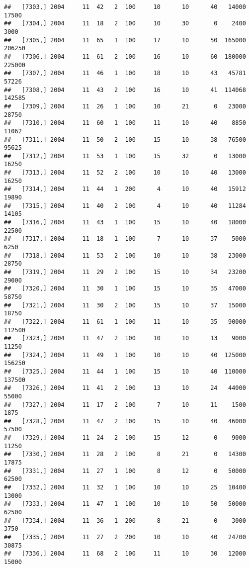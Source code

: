 \documentclass{article}\usepackage[]{graphicx}\usepackage[]{color}
\makeatletter
\newenvironment{kframe}{%
 \def\at@end@of@kframe{}%
 \ifinner\ifhmode%
  \def\at@end@of@kframe{\end{minipage}}%
  \begin{minipage}{\columnwidth}%
 \fi\fi%
 \def\FrameCommand##1{\hskip\@totalleftmargin \hskip-\fboxsep
 \colorbox{shadecolor}{##1}\hskip-\fboxsep
     \hskip-\linewidth \hskip-\@totalleftmargin \hskip\columnwidth}%
 \MakeFramed {\advance\hsize-\width
   \@totalleftmargin\z@ \linewidth\hsize
   \@setminipage}}%
 {\par\unskip\endMakeFramed%
 \at@end@of@kframe}
\newenvironment{knitrout}{}{} %
\makeatother
\begin{document}
\begin{knitrout}
\begin{kframe}
\begin{verbatim}
##   [7303,] 2004     11  42   2  100     10      10      40   14000   17500
##   [7304,] 2004     11  18   2  100     10      30       0    2400    3000
##   [7305,] 2004     11  65   1  100     17      10      50  165000  206250
##   [7306,] 2004     11  61   2  100     16      10      60  180000  225000
##   [7307,] 2004     11  46   1  100     18      10      43   45781   57226
##   [7308,] 2004     11  43   2  100     16      10      41  114068  142585
##   [7309,] 2004     11  26   1  100     10      21       0   23000   28750
##   [7310,] 2004     11  60   1  100     11      10      40    8850   11062
##   [7311,] 2004     11  50   2  100     15      10      38   76500   95625
##   [7312,] 2004     11  53   1  100     15      32       0   13000   16250
##   [7313,] 2004     11  52   2  100     10      10      40   13000   16250
##   [7314,] 2004     11  44   1  200      4      10      40   15912   19890
##   [7315,] 2004     11  40   2  100      4      10      40   11284   14105
##   [7316,] 2004     11  43   1  100     15      10      40   18000   22500
##   [7317,] 2004     11  18   1  100      7      10      37    5000    6250
##   [7318,] 2004     11  53   2  100     10      10      38   23000   28750
##   [7319,] 2004     11  29   2  100     15      10      34   23200   29000
##   [7320,] 2004     11  30   1  100     15      10      35   47000   58750
##   [7321,] 2004     11  30   2  100     15      10      37   15000   18750
##   [7322,] 2004     11  61   1  100     11      10      35   90000  112500
##   [7323,] 2004     11  47   2  100     10      10      13    9000   11250
##   [7324,] 2004     11  49   1  100     10      10      40  125000  156250
##   [7325,] 2004     11  44   1  100     15      10      40  110000  137500
##   [7326,] 2004     11  41   2  100     13      10      24   44000   55000
##   [7327,] 2004     11  17   2  100      7      10      11    1500    1875
##   [7328,] 2004     11  47   2  100     15      10      40   46000   57500
##   [7329,] 2004     11  24   2  100     15      12       0    9000   11250
##   [7330,] 2004     11  28   2  100      8      21       0   14300   17875
##   [7331,] 2004     11  27   1  100      8      12       0   50000   62500
##   [7332,] 2004     11  32   1  100     10      10      25   10400   13000
##   [7333,] 2004     11  47   1  100     10      10      50   50000   62500
##   [7334,] 2004     11  36   1  200      8      21       0    3000    3750
##   [7335,] 2004     11  27   2  200     10      10      40   24700   30875
##   [7336,] 2004     11  68   2  100     11      10      30   12000   15000

\end{verbatim}
\end{kframe}
\end{knitrout}
\end{document}
